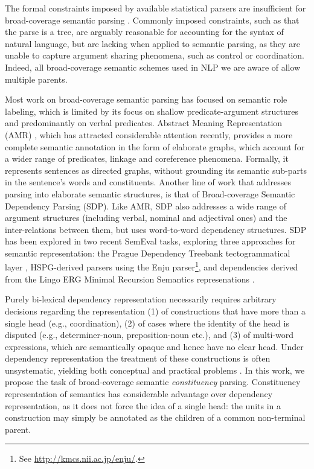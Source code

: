 \documentclass[11pt]{article}
\begin{document}

The formal constraints imposed by available statistical parsers are insufficient for
broad-coverage semantic parsing \cite{oepen2015semeval}.
Commonly imposed constraints, such as that the parse is a tree, are arguably reasonable for
accounting for the syntax of natural language, but are lacking when applied to semantic parsing,
as they are unable to capture argument sharing phenomena, such as control or coordination.
Indeed, all broad-coverage semantic schemes used in NLP we are aware of allow multiple parents.

Most work on broad-coverage semantic parsing has focused on semantic role labeling,
which is limited by its focus on shallow predicate-argument structures and predominantly on verbal
predicates. Abstract Meaning Representation (AMR) \cite{banarescu2013abstract},
which has attracted considerable attention recently,
provides a more complete semantic annotation in the form of elaborate graphs,
which account for a wider range of predicates, linkage and coreference phenomena.
Formally, it represents sentences as directed graphs, without grounding its
semantic sub-parts in the sentence's words and constituents.
Another line of work that addresses parsing into elaborate semantic structures,
is that of Broad-coverage Semantic Dependency Parsing \cite{oepen2014semeval,oepen2015semeval} (SDP).
Like AMR, SDP also addresses a wide range of argument structures (including verbal, nominal and adjectival ones)
and the inter-relations between them, but uses word-to-word dependency structures.
SDP has been explored in two recent SemEval tasks, exploring three approaches
for semantic representation: the Prague
Dependency Treebank tectogrammatical layer \cite{bohmova2003prague},
HSPG-derived parsers using the Enju parser\footnote{See \url{http://kmcs.nii.ac.jp/enju/}.},
and dependencies derived from the Lingo ERG
Minimal Recursion Semantics represenations \cite{Flic:02}.

Purely bi-lexical dependency representation necessarily requires arbitrary decisions regarding the representation (1) of constructions that have more than a single
head (e.g., coordination), (2) of cases where the identity of the head is disputed
(e.g., determiner-noun, preposition-noun etc.), and (3) of multi-word expressions,
which are semantically opaque and hence have no clear head. Under dependency representation
the treatment of these constructions is often unsystematic, yielding both conceptual
and practical problems \cite{schwartz2011neutralizing,Ivanova2012who,tsarfaty2012cross}.
In this work, we propose the task of broad-coverage semantic {\it constituency} parsing. 
Constituency representation of semantics has considerable advantage over dependency representation, as it does not force the idea of a single head: the units in a construction may simply be annotated as the children of a common non-terminal parent.
\end{document}
